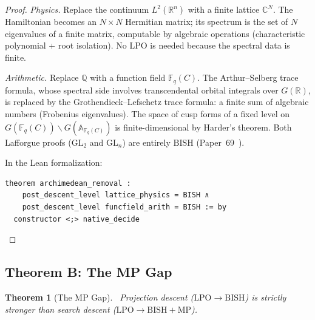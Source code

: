 \documentclass[11pt]{article}
\newtheorem{theorem}{Theorem}[section]
\theoremstyle{definition}
\theoremstyle{remark}
\newcommand{\leanok}{\textsf{\small \textcolor{green!70!black}{\checkmark}}}
\newcommand{\Q}{\mathbb{Q}}
\newcommand{\R}{\mathbb{R}}
\newcommand{\C}{\mathbb{C}}
\newcommand{\Fq}{\mathbb{F}_q}
\newcommand{\A}{\mathbb{A}}
\newcommand{\GL}{\mathrm{GL}}
\newcommand{\BISH}{\mathrm{BISH}}
\newcommand{\LPO}{\mathrm{LPO}}
\newcommand{\MP}{\mathrm{MP}}
\begin{document}
\begin{proof}
\emph{Physics.} Replace the continuum $L^2(\R^n)$ with a finite lattice $\C^N$. The Hamiltonian becomes an $N \times N$ Hermitian matrix; its spectrum is the set of $N$ eigenvalues of a finite matrix, computable by algebraic operations (characteristic polynomial + root isolation). No $\LPO$ is needed because the spectral data is finite.

\emph{Arithmetic.} Replace $\Q$ with a function field $\Fq(C)$. The Arthur--Selberg trace formula, whose spectral side involves transcendental orbital integrals over $G(\R)$, is replaced by the Grothendieck--Lefschetz trace formula: a finite sum of algebraic numbers (Frobenius eigenvalues). The space of cusp forms of a fixed level on $G(\Fq(C)) \backslash G(\A_{\Fq(C)})$ is finite-dimensional by Harder's theorem. Both Lafforgue proofs ($\GL_2$ and $\GL_n$) are entirely $\BISH$ (Paper~69~\cite{Paper69}).

In the Lean formalization:
\begin{lstlisting}
theorem archimedean_removal :
    post_descent_level lattice_physics = BISH ∧
    post_descent_level funcfield_arith = BISH := by
  constructor <;> native_decide
\end{lstlisting}
\end{proof}

\subsection{Theorem B: The MP Gap}

\begin{theorem}[The MP Gap]
\label{thm:B}
\leanok\ Projection descent ($\LPO \to \BISH$) is strictly stronger than search descent ($\LPO \to \BISH + \MP$).
\end{theorem}
\end{document}
